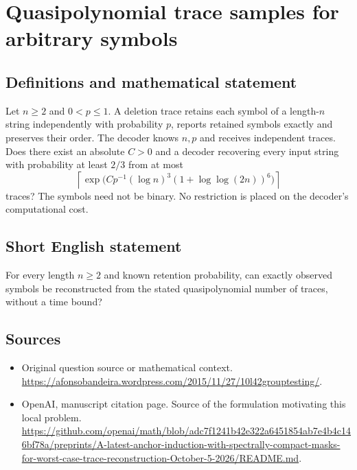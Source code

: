 \documentclass[11pt]{article}
\begin{document}
\section*{Quasipolynomial trace samples for arbitrary symbols}\label{statement}
\subsection{Definitions and mathematical statement}
Let $n\ge2$ and $0<p\le1$. A deletion trace retains each symbol of a length-$n$ string independently with probability $p$, reports retained symbols exactly and preserves their order. The decoder knows $n,p$ and receives independent traces. Does there exist an absolute $C>0$ and a decoder recovering every input string with probability at least $2/3$ from at most
\[
 \left\lceil\exp\bigl(Cp^{-1}(\log n)^3(1+\log\log(2n))^6\bigr)\right\rceil
\]
traces? The symbols need not be binary. No restriction is placed on the decoder's computational cost.

\subsection{Short English statement}
For every length $n\ge2$ and known retention probability, can exactly observed symbols be reconstructed from the stated quasipolynomial number of traces, without a time bound?

\subsection{Sources}
\begin{itemize}
\item[S1] Original question source or mathematical context.
\url{https://afonsobandeira.wordpress.com/2015/11/27/10l42grouptesting/}.
\item[S2] OpenAI, manuscript citation page. Source of the formulation motivating this local problem.
\url{https://github.com/openai/math/blob/adc7f1241b42e322a6451854ab7e4b4c146bf78a/preprints/A-latest-anchor-induction-with-spectrally-compact-masks-for-worst-case-trace-reconstruction-October-5-2026/README.md}.
\end{itemize}
\end{document}
